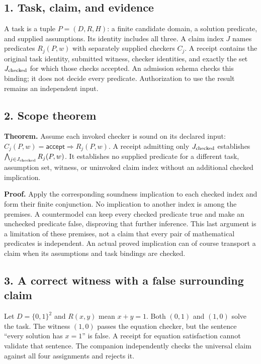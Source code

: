 \documentclass[
  11pt,
]{article}
\begin{document}
\subsection{1. Task, claim, and evidence}\label{task-claim-and-evidence}

A task is a tuple \(P=(D,R,H)\): a finite candidate domain, a solution
predicate, and supplied assumptions. Its identity includes all three. A
claim index \(J\) names predicates \(R_j(P,w)\) with separately supplied
checkers \(C_j\). A receipt contains the original task identity,
submitted witness, checker identities, and exactly the set
\(J_{\rm checked}\) for which those checks accepted. An admission schema
checks this binding; it does not decide every predicate. Authorization
to use the result remains an independent input.

\subsection{2. Scope theorem}\label{scope-theorem}

\textbf{Theorem.} Assume each invoked checker is sound on its declared
input: \(C_j(P,w)=\mathsf{accept}\Rightarrow R_j(P,w)\). A receipt
admitting only \(J_{\rm checked}\) establishes
\(\bigwedge_{j\in J_{\rm checked}}R_j(P,w)\). It establishes no supplied
predicate for a different task, assumption set, witness, or uninvoked
claim index without an additional checked implication.

\textbf{Proof.} Apply the corresponding soundness implication to each
checked index and form their finite conjunction. No implication to
another index is among the premises. A countermodel can keep every
checked predicate true and make an unchecked predicate false, disproving
that further inference. This last argument is a limitation of these
premises, not a claim that every pair of mathematical predicates is
independent. An actual proved implication can of course transport a
claim when its assumptions and task bindings are checked.

\subsection{3. A correct witness with a false surrounding
claim}\label{a-correct-witness-with-a-false-surrounding-claim}

Let \(D=\{0,1\}^2\) and \(R(x,y)\) mean \(x+y=1\). Both \((0,1)\) and
\((1,0)\) solve the task. The witness \((1,0)\) passes the equation
checker, but the sentence ``every solution has \(x=1\)'' is false. A
receipt for equation satisfaction cannot validate that sentence. The
companion independently checks the universal claim against all four
assignments and rejects it.
\end{document}
